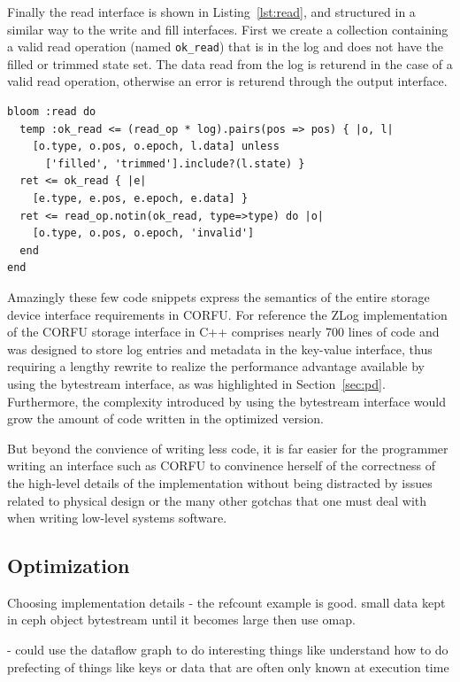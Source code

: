 \documentclass[10pt,twocolumn]{article}
\begin{document}
Finally the read interface is shown in Listing~\ref{lst:read}, and structured
in a similar way to the write and fill interfaces. First we create a collection
containing a valid read operation (named \texttt{ok\_read}) that is in the log
and does not have the filled or trimmed state set.  The data read from the log
is returend in the case of a valid read operation, otherwise an error is
returend through the output interface.

\begin{lstlisting}[caption={Read}, label=lst:read]
bloom :read do
  temp :ok_read <= (read_op * log).pairs(pos => pos) { |o, l|
    [o.type, o.pos, o.epoch, l.data] unless
      ['filled', 'trimmed'].include?(l.state) }
  ret <= ok_read { |e|
    [e.type, e.pos, e.epoch, e.data] }
  ret <= read_op.notin(ok_read, type=>type) do |o|
    [o.type, o.pos, o.epoch, 'invalid']
  end
end
\end{lstlisting}

Amazingly these few code snippets express the semantics of the entire storage
device interface requirements in CORFU. For reference the ZLog implementation
of the CORFU storage interface in C++ comprises nearly 700 lines of code and
was designed to store log entries and metadata in the key-value interface,
thus requiring a lengthy rewrite to realize the performance advantage
available by using the bytestream interface, as was highlighted in
Section~\ref{sec:pd}. Furthermore, the complexity introduced by using the
bytestream interface would grow the amount of code written in the optimized
version.

But beyond the convience of writing less code, it is far easier for the
programmer writing an interface such as CORFU to convinence herself of the
correctness of the high-level details of the implementation without being
distracted by issues related to physical design or the many other gotchas that
one must deal with when writing low-level systems software.

\subsection{Optimization}

Choosing implementation details
  - the refcount example is good. small data kept in ceph object bytestream
until it becomes large then use omap.

  - could use the dataflow graph to do interesting things like understand how
  to do prefecting of things like keys or data that are often only known at
  execution time
\end{document}
